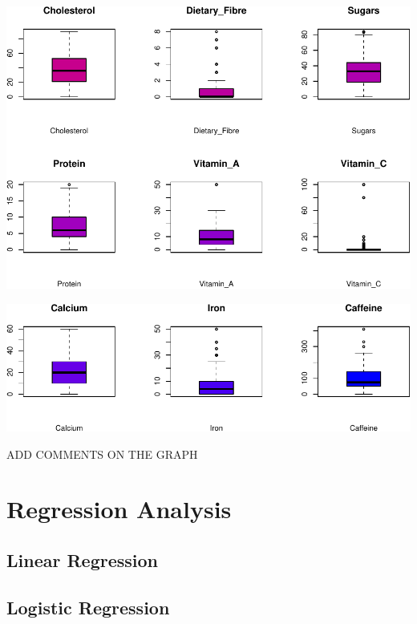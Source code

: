 \documentclass[
]{article}
\begin{document}
\begin{center}\includegraphics{Statistical_Learning_Final_Report_files/figure-latex/boxplot-2} \end{center}

\begin{center}\includegraphics{Statistical_Learning_Final_Report_files/figure-latex/boxplot-3} \end{center}

ADD COMMENTS ON THE GRAPH

\hypertarget{regression-analysis}{%
\section{Regression Analysis}\label{regression-analysis}}

\hypertarget{linear-regression}{%
\subsection{Linear Regression}\label{linear-regression}}

\hypertarget{logistic-regression}{%
\subsection{Logistic Regression}\label{logistic-regression}}
\end{document}
